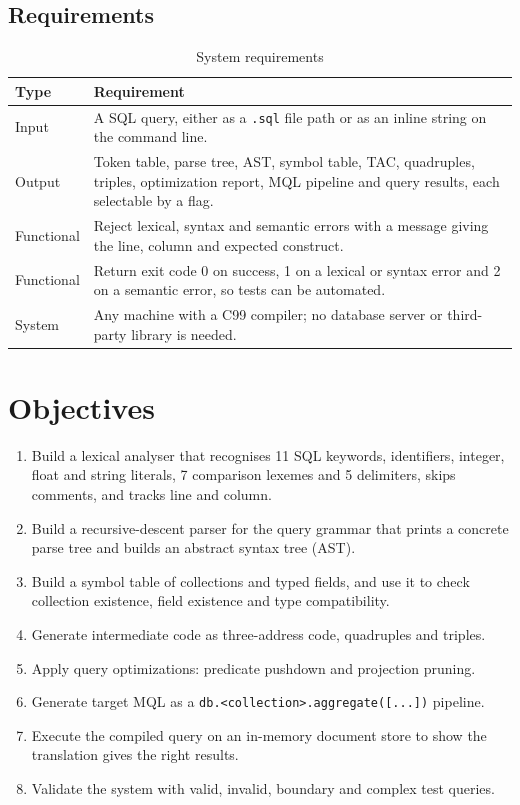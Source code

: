 \documentclass[12pt,a4paper]{report}
\newcommand{\codeus}{\textunderscore\allowbreak}
\DeclareRobustCommand{\code}[1]{\texttt{\let\_\codeus #1}}
\begin{document}
\section{Requirements}
\begin{table}[H]
\centering
\begin{tabularx}{\linewidth}{|P{2.6cm}|L|}
\hline
\textbf{Type} & \textbf{Requirement} \\ \hline
Input & A SQL query, either as a \code{.sql} file path or as an inline string on the command line. \\ \hline
Output & Token table, parse tree, AST, symbol table, TAC, quadruples, triples, optimization report, MQL pipeline and query results, each selectable by a flag. \\ \hline
Functional & Reject lexical, syntax and semantic errors with a message giving the line, column and expected construct. \\ \hline
Functional & Return exit code 0 on success, 1 on a lexical or syntax error and 2 on a semantic error, so tests can be automated. \\ \hline
System & Any machine with a C99 compiler; no database server or third-party library is needed. \\ \hline
\end{tabularx}
\caption{System requirements}
\end{table}

\chapter{Objectives}
\begin{enumerate}
  \item Build a lexical analyser that recognises 11 SQL keywords, identifiers, integer, float and string literals, 7 comparison lexemes and 5 delimiters, skips comments, and tracks line and column.
  \item Build a recursive-descent parser for the query grammar that prints a concrete parse tree and builds an abstract syntax tree (AST).
  \item Build a symbol table of collections and typed fields, and use it to check collection existence, field existence and type compatibility.
  \item Generate intermediate code as three-address code, quadruples and triples.
  \item Apply query optimizations: predicate pushdown and projection pruning.
  \item Generate target MQL as a \code{db.<collection>.\allowbreak aggregate([...])} pipeline.
  \item Execute the compiled query on an in-memory document store to show the translation gives the right results.
  \item Validate the system with valid, invalid, boundary and complex test queries.
\end{enumerate}
\end{document}
